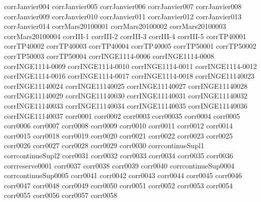 {corrJanvier004}
{corrJanvier005}
{corrJanvier006}
{corrJanvier007}
{corrJanvier008}
{corrJanvier009}
{corrJanvier010}
{corrJanvier011}
{corrJanvier012}
{corrJanvier013}
{corrJanvier014}
{corrMars20100001}
{corrMars20100002}
{corrMars20100003}
{corrMars20100004}
{corrIII-1}
{corrIII-2}
{corrIII-3}
{corrIII-4}
{corrIII-5}
{corrTP40001}
{corrTP40002}
{corrTP40003}
{corrTP40004}
{corrTP40005}
{corrTP50001}
{corrTP50002}
{corrTP50003}
{corrTP50004}
{corrINGE1114-0006}
{corrINGE1114-0008}
{corrINGE1114-0009}
{corrINGE1114-0010}
{corrINGE1114-0011}
{corrINGE1114-0012}
{corrINGE1114-0016}
{corrINGE1114-0017}
{corrINGE1114-0018}
{corrINGE11140023}
{corrINGE11140024}
{corrINGE11140025}
{corrINGE11140027}
{corrINGE11140028}
{corrINGE11140029}
{corrINGE11140030}
{corrINGE11140031}
{corrINGE11140032}
{corrINGE11140033}
{corrINGE11140034}
{corrINGE11140035}
{corrINGE11140036}
{corrINGE11140037}
{corr0001}
{corr0002}
{corr0003}
{corr00035}
{corr0004}
{corr0005}
{corr0006}
{corr0007}
{corr0008}
{corr0009}
{corr0010}
{corr0011}
{corr0012}
{corr0014}
{corr0015}
{corr0018}
{corr0019}
{corr0020}
{corr0021}
{corr0022}
{corr0023}
{corr0025}
{corr0026}
{corr0027}
{corr0028}
{corr0029}
{corr0030}
{corrcontinueSupl1}
{corrcontinueSupl2}
{corr0031}
{corr0032}
{corr0033}
{corr0034}
{corr0035}
{corr0036}
{corrreserve0001}
{corr0037}
{corr0038}
{corr0039}
{corr0040}
{corrcontinueSup0004}
{corrcontinueSup0005}
{corr0041}
{corr0042}
{corr0043}
{corr0044}
{corr0045}
{corr0046}
{corr0047}
{corr0048}
{corr0049}
{corr0050}
{corr0051}
{corr0052}
{corr0053}
{corr0054}
{corr0055}
{corr0056}
{corr0057}
{corr0058}
